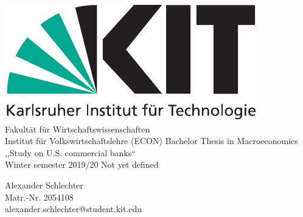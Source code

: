 \documentclass[12pt, a4paper]{article} %
\begin{document}

\begin{titlepage}
\begin{center}
\includegraphics[scale=0.65]{KITlogo}\\
\large
Fakultät für Wirtschaftswissenschaften\\
Institut für Volkswirtschaftslehre (ECON)
\vfill{
\Large
Bachelor Thesis in Macroeconomics\\\vspace{0.5cm}
,,Study on U.S. commercial banks``\\\vspace{0.5cm}
Winter semester 2019/20%
}
\vfill{
\LARGE
Not yet defined
\\ 
\vspace{0.5cm}
\normalsize
}
\end{center}

\vfill{
\normalsize
\noindent Alexander Schlechter \\
Matr.-Nr. 2054108 \\
alexander.schlechter@student.kit.edu}
\end{titlepage}
\newpage

\end{document}
